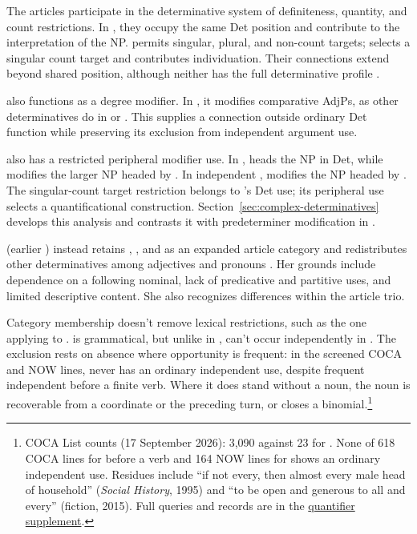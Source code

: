 \documentclass[12pt]{article}
\begin{document}
The articles participate in the determinative system of definiteness, quantity, and count restrictions. In , they occupy the same Det position and contribute to the interpretation of the NP.  permits singular, plural, and non-count targets;  selects a singular count target and contributes individuation. Their connections extend beyond shared position, although neither has the full determinative profile \citep[368--373]{huddleston2002}.

 also functions as a degree modifier. In , it modifies comparative AdjPs, as other determinatives do in  or  \citep[1131--1132, 1135--1136]{huddleston2002}. This supplies a connection outside ordinary Det function while preserving its exclusion from independent argument use.

 also has a restricted peripheral modifier use. In ,  heads the NP in Det, while  modifies the larger NP headed by . In independent ,  modifies the NP headed by . The singular-count target restriction belongs to 's Det use; its peripheral use selects a quantificational construction. Section~\ref{sec:complex-determinatives} develops this analysis and contrasts it with predeterminer modification in .

\textcite[153--158]{spinillo2004reconceptualising} (earlier \citealp{spinillo2000determiners}) instead retains , , and  as an expanded article category and redistributes other determinatives among adjectives and pronouns \citep[194--195]{spinillo2004reconceptualising}. Her grounds include dependence on a following nominal, lack of predicative and partitive uses, and limited descriptive content. She also recognizes differences within the article trio.

Category membership doesn't remove lexical restrictions, such as the one applying to .  is grammatical, but unlike  in ,  can't occur independently in . The exclusion rests on absence where opportunity is frequent: in the screened COCA and NOW lines,  never has an ordinary independent use, despite frequent independent  before a finite verb. Where it does stand without a noun, the noun is recoverable from a coordinate or the preceding turn, or  closes a binomial.\footnote{COCA List counts (17 September 2026):  3,090 against 23 for . None of 618 COCA lines for  before a verb and 164 NOW lines for  shows an ordinary independent use. Residues include \enquote{if not every, then almost every male head of household} (\textit{Social History}, 1995) and \enquote{to be open and generous to all and every} (fiction, 2015). Full queries and records are in the \href{run:quantifier-controls.pdf}{quantifier supplement}.}
\end{document}
